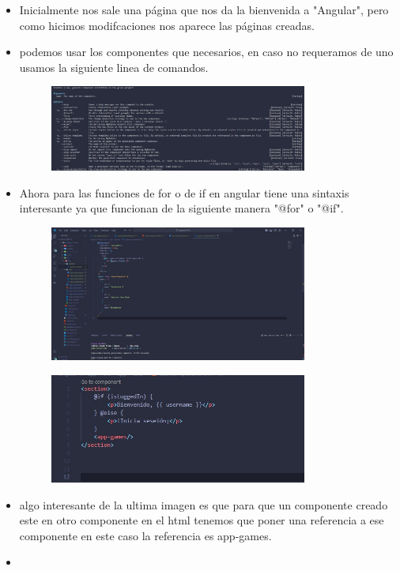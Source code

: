 \documentclass{article}
\begin{document}
\begin{itemize}
\begin{figure}[H]
		\end{figure}
		\item Inicialmente nos sale una página que nos da la bienvenida a "Angular", pero como hicimos modifcaciones nos aparece las páginas creadas.
		\item podemos usar los componentes que necesarios, en caso no requeramos de uno usamos la siguiente linea de comandos.
		\begin{figure}[H]
			\centering
			\includegraphics[width=0.8\textwidth,keepaspectratio]{img/comocrearcomponentes.jpg}
	
		\end{figure}
		\item Ahora para las funciones de for o de if en angular tiene una sintaxis interesante ya que funcionan de la siguiente manera "@for" o "@if".
		\begin{figure}[H]
			\centering
			\includegraphics[width=0.8\textwidth,keepaspectratio]{img/comofuncionaforenAngular.jpg}
	
		\end{figure}
		\begin{figure}[H]
			\centering
			\includegraphics[width=0.8\textwidth,keepaspectratio]{img/paracolocarlousamosappgames.jpg}
	
		\end{figure}
		\item algo interesante de la ultima imagen es que para que un componente creado este en otro componente en el html tenemos que poner una referencia a ese componente en este caso la referencia es app-games.
		\item 
	\end{itemize}
	
\end{document}

